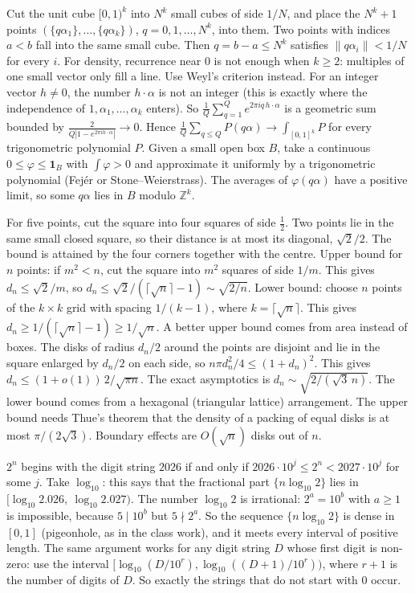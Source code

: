 \documentclass[11pt,a4paper]{article}
\begin{document}

 Cut the unit cube $[0,1)^k$ into $N^k$ small cubes of side $1/N$, and place the $N^k+1$ points $(\{q\alpha_1\},\dots,\{q\alpha_k\})$, $q=0,1,\dots,N^k$, into them.
 Two points with indices $a<b$ fall into the same small cube. Then $q=b-a\le N^k$ satisfies $\|q\alpha_i\|<1/N$ for every $i$.
 For density, recurrence near $0$ is not enough when $k\ge 2$: multiples of one small vector only fill a line. Use Weyl's criterion instead. For an integer vector $h\neq0$, the number $h\cdot\alpha$ is not an integer (this is exactly where the independence of $1,\alpha_1,\dots,\alpha_k$ enters). So $\frac1Q\sum_{q=1}^Q e^{2\pi i q\,h\cdot\alpha}$ is a geometric sum bounded by $\frac{2}{Q|1-e^{2\pi i h\cdot\alpha}|}\to0$.
 Hence $\frac1Q\sum_{q\le Q}P(q\alpha)\to\int_{[0,1]^k}P$ for every trigonometric polynomial $P$. Given a small open box $B$, take a continuous $0\le\varphi\le\mathbf 1_B$ with $\int\varphi>0$ and approximate it uniformly by a trigonometric polynomial (Fej\'er or Stone--Weierstrass). The averages of $\varphi(q\alpha)$ have a positive limit, so some $q\alpha$ lies in $B$ modulo $\mathbb Z^k$.

 For five points, cut the square into four squares of side $\tfrac12$. Two points lie in the same small closed square, so their distance is at most its diagonal, $\sqrt2/2$. The bound is attained by the four corners together with the centre.
 Upper bound for $n$ points: if $m^2<n$, cut the square into $m^2$ squares of side $1/m$. This gives $d_n\le\sqrt2/m$, so $d_n\le\sqrt2/(\lceil\sqrt n\rceil-1)\sim\sqrt{2/n}$. Lower bound: choose $n$ points of the $k\times k$ grid with spacing $1/(k-1)$, where $k=\lceil\sqrt n\rceil$. This gives $d_n\ge 1/(\lceil\sqrt n\rceil-1)\ge1/\sqrt n$.
 A better upper bound comes from area instead of boxes. The disks of radius $d_n/2$ around the points are disjoint and lie in the square enlarged by $d_n/2$ on each side, so $n\pi d_n^2/4\le(1+d_n)^2$. This gives $d_n\le(1+o(1))\,2/\sqrt{\pi n}$.
 The exact asymptotics is $d_n\sim\sqrt{2/(\sqrt3\,n)}$. The lower bound comes from a hexagonal (triangular lattice) arrangement. The upper bound needs Thue's theorem that the density of a packing of equal disks is at most $\pi/(2\sqrt3)$. Boundary effects are $O(\sqrt n)$ disks out of $n$.

 $2^n$ begins with the digit string $2026$ if and only if $2026\cdot10^j\le 2^n<2027\cdot10^j$ for some $j$. Take $\log_{10}$: this says that the fractional part $\{n\log_{10}2\}$ lies in $[\log_{10}2.026,\ \log_{10}2.027)$.
 The number $\log_{10}2$ is irrational: $2^a=10^b$ with $a\geq 1$ is impossible, because $5\mid 10^b$ but $5\nmid 2^a$. So the sequence $\{n\log_{10}2\}$ is dense in $[0,1]$ (pigeonhole, as in the class work), and it meets every interval of positive length.
 The same argument works for any digit string $D$ whose first digit is non-zero: use the interval $[\log_{10}(D/10^{r}),\log_{10}((D+1)/10^{r}))$, where $r+1$ is the number of digits of $D$. So exactly the strings that do not start with $0$ occur.
\end{document}
